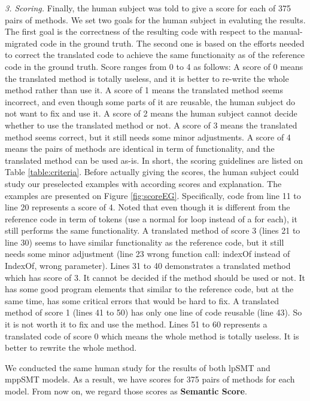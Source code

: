 \emph{3. Scoring.} Finally, the human subject was told to give a score
for each of 375 pairs of methods. We set two goals for the human
subject in evaluting the results. The first goal is the correctness of
the resulting code with respect to the manual-migrated code in the
ground truth. The second one is based on the efforts needed to correct
the translated code to achieve the same functionaity as of the
reference code in the ground truth.
%
%
Score ranges from 0 to 4 as follows: A score of 0 means the translated
method is totally useless, and it is better to re-write the whole
method rather than use it. A score of 1 means the translated method
seems incorrect, and even though some parts of it are reusable, the
human subject do not want to fix and use it. A score of 2 means the
human subject cannot decide whether to use the translated method or
not. A score of 3 means the translated method seems correct, but it
still needs some minor adjustments. A score of 4 means the pairs of
methods are identical in term of functionality, and the translated
method can be used as-is. In short, the scoring guidelines are listed
on Table \ref{table:criteria}. Before actually giving the scores, the
human subject could study our preselected examples with according
scores and explanation. The examples are presented on Figure
\ref{fig:scoreEG}. Specifically, code from line 11 to line 20
represents a score of 4. Noted that even though it is different from
the reference code in term of tokens (use a normal for loop instead of
a for each), it still performs the same functionality. A translated
method of score 3 (lines 21 to line 30) seems to have similar
functionality as the reference code, but it still needs some minor
adjustment (line 23 wrong function call: indexOf instead of IndexOf,
wrong parameter). Lines 31 to 40 demonstrates a translated method
which has score of 3. It cannot be decided if the method should be
used or not. It has some good program elements that similar to the
reference code, but at the same time, has some critical errors that
would be hard to fix. A translated method of score 1 (lines 41 to 50)
has only one line of code reusable (line 43). So it is not worth it to
fix and use the method. Lines 51 to 60 represents a translated code of
score 0 which means the whole method is totally useless. It is better
to rewrite the whole method.

We conducted the same human study for the results of both lpSMT and mppSMT models. As a result, we have scores for 375 pairs of methods for each model. From now on, we regard those scores as \textbf{Semantic Score}.

